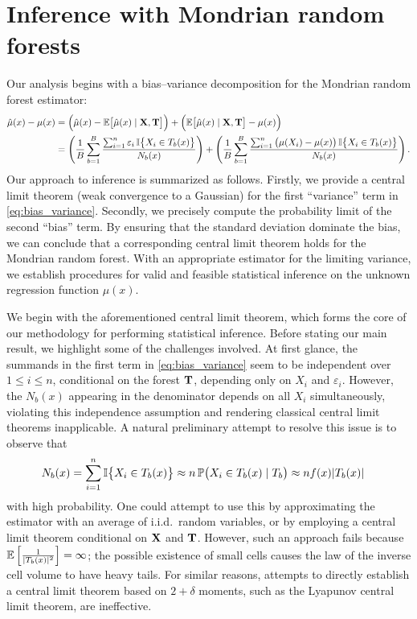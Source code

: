 \section{Inference with Mondrian random forests}%
\label{sec:mondrian_inference}

Our analysis begins with a bias--variance decomposition
for the Mondrian random forest estimator:
%
\begin{align}
  \label{eq:bias_variance}
  \hat\mu(x) - \mu(x)
  &=
  \Big( \hat\mu(x) - \mathbb{E} \big[ \hat \mu(x) \mid \mathbf{X}, \mathbf{T} \big]\Big)
  + \Big( \mathbb{E} \big[ \hat \mu(x) \mid \mathbf{X}, \mathbf{T} \big] - \mu(x)\Big) \\
  &=
  \nonumber
  \left(
    \frac{1}{B}
    \sum_{b=1}^B
    \frac{\sum_{i=1}^n \varepsilon_i \, \mathbb{I}\big\{ X_i \in T_b(x) \big\}}
    {N_b(x)}
  \right)
  + \left(
    \frac{1}{B}
    \sum_{b=1}^B
    \frac{\sum_{i=1}^n \big(\mu(X_i) - \mu(x)\big) \,
    \mathbb{I}\big\{ X_i \in T_b(x) \big\}}
    {N_b(x)}
  \right).
\end{align}
%
Our approach to inference is summarized as follows.
Firstly, we provide a central limit theorem
(weak convergence to a Gaussian)
for the first ``variance'' term in \eqref{eq:bias_variance}.
Secondly, we precisely compute the probability limit of the second
``bias'' term.
By ensuring that the standard deviation dominate the bias,
we can conclude that a corresponding central limit theorem
holds for the Mondrian random forest.
With an appropriate estimator for the limiting variance,
we establish procedures for valid and feasible statistical inference
on the unknown regression function $\mu(x)$.

We begin with the aforementioned central limit theorem,
which forms the core of our methodology for performing statistical inference.
Before stating our main result,
we highlight some of the challenges involved.
At first glance, the summands in the first term in \eqref{eq:bias_variance}
seem to be independent over $1 \leq i \leq n$, conditional
on the forest $\mathbf{T}$, depending only on $X_i$ and $\varepsilon_i$.
However, the $N_b(x)$ appearing in the denominator depends on all $X_i$
simultaneously, violating this independence assumption
and rendering classical central limit theorems inapplicable.
A natural preliminary attempt to resolve this issue is to observe that
%
\begin{align*}
  N_b(x)&=
  \sum_{i=1}^{n} \mathbb{I}\big\{X_i \in T_b(x)\big\}
  \approx
  n \, \mathbb{P} \big( X_i \in T_b(x) \mid T_b \big)
  \approx
  n f(x) |T_b(x)|
\end{align*}
%
with high probability.
One could attempt to use this by
approximating the estimator with an average of
i.i.d.\ random variables, or by
employing a central limit theorem
conditional on $\mathbf{X}$ and $\mathbf{T}$.
However, such an approach fails because
$\mathbb{E} \left[ \frac{1}{|T_b(x)|^2} \right] = \infty$;
the possible existence of small cells causes the law of the
inverse cell volume to have heavy tails.
For similar reasons, attempts to directly establish a central limit theorem
based on $2 + \delta$ moments, such as the Lyapunov central limit theorem,
are ineffective.

